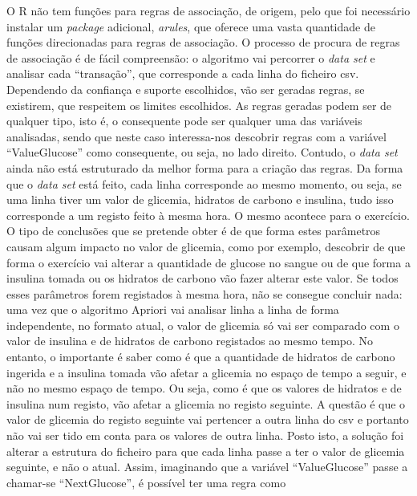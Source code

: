 O R não tem funções para regras de associação, de origem, pelo que foi necessário instalar um \textit{package} adicional, \textit{arules}, que oferece uma vasta quantidade de funções direcionadas para regras de associação. O processo de procura de regras de associação é de fácil compreensão: o algoritmo vai percorrer o \textit{data set} e analisar cada ``transação'', que corresponde a cada linha do ficheiro csv. Dependendo da confiança e suporte escolhidos, vão ser geradas regras, se existirem, que respeitem os limites escolhidos. As regras geradas podem ser de qualquer tipo, isto é, o consequente pode ser qualquer uma das variáveis analisadas, sendo que neste caso interessa-nos descobrir regras com a variável ``Value\textunderscore Glucose'' como consequente, ou seja, no lado direito. Contudo, o \textit{data set} ainda não está estruturado da melhor forma para a criação das regras. 
Da forma que o \textit{data set} está feito, cada linha corresponde ao mesmo momento, ou seja, se uma linha tiver um valor de glicemia, hidratos de carbono e insulina, tudo isso corresponde a um registo feito à mesma hora. O mesmo acontece para o exercício. O tipo de conclusões que se pretende obter é de que forma estes parâmetros causam algum impacto no valor de glicemia, como por exemplo, descobrir de que forma o exercício vai alterar a quantidade de glucose no sangue ou de que forma a insulina tomada ou os hidratos de carbono vão fazer alterar este valor. Se todos esses parâmetros forem registados à mesma hora, não se consegue concluir nada: uma vez que o algoritmo Apriori vai analisar linha a linha de forma independente, no formato atual, o valor de glicemia só vai ser comparado com o valor de insulina e de hidratos de carbono registados ao mesmo tempo. No entanto, o importante é saber como é que a quantidade de hidratos de carbono ingerida e a insulina tomada vão afetar a glicemia no espaço de tempo a seguir, e não no mesmo espaço de tempo. Ou seja, como é que os valores de hidratos e de insulina num registo, vão afetar a glicemia no registo seguinte. A questão é que o valor de glicemia do registo seguinte vai pertencer a outra linha do csv e portanto não vai ser tido em conta para os valores de outra linha. Posto isto, a solução foi alterar a estrutura do ficheiro para que cada linha passe a ter o valor de glicemia seguinte, e não o atual. Assim, imaginando que a variável ``Value\textunderscore Glucose'' passe a chamar-se ``Next\textunderscore Glucose'', é possível ter uma regra como

